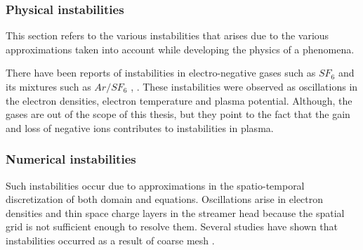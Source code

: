 \documentclass[paper=a4, fontsize=13pt]{scrartcl}
\begin{document}
\subsubsection{Physical instabilities}
This section refers to the various instabilities that arises due to the various approximations taken into account while developing the physics of a phenomena. 

There have been reports of instabilities in electro-negative gases such as $SF_6$ and its mixtures such as $Ar/SF_6$ \cite{Lieberman1999InstabilitiesGases}, \cite{Chabert2001InstabilitiesDischarges}. These instabilities were observed as oscillations in the electron densities, electron temperature and plasma potential. Although, the gases are out of the scope of this thesis, but they point to the fact that the gain and loss of negative ions contributes to instabilities in plasma. 

\subsubsection{Numerical instabilities}

Such instabilities occur due to approximations in the spatio-temporal discretization of both domain and equations. Oscillations arise in electron densities and thin space charge layers in the streamer head because the spatial grid is not sufficient enough to resolve them. Several studies have shown that instabilities occurred as a result of coarse mesh \cite{Bagheri2018ComparisonAir}.



\printbibliography
%
\end{document}
